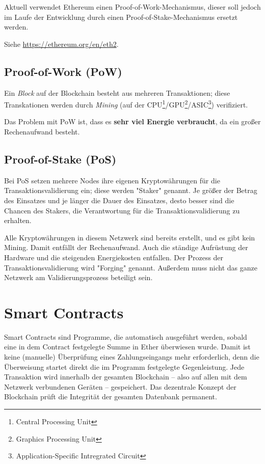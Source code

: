 Aktuell verwendet Ethereum einen Proof-of-Work-Mechanismus, dieser soll jedoch im Laufe der Entwicklung durch einen Proof-of-Stake-Mechanismus ersetzt werden.

Siehe \url{https://ethereum.org/en/eth2}.

\subsection{Proof-of-Work (PoW)} \label{l_mining}
Ein \textit{Block} auf der Blockchain besteht aus mehreren Transaktionen; diese Transkationen werden durch \textit{Mining} (auf der CPU\footnote{Central Processing Unit}/GPU\footnote{Graphics Processing Unit}/ASIC\footnote{Application-Specific Intregrated Circuit}) verifiziert.

Das Problem mit PoW ist, dass es \textbf{sehr viel Energie verbraucht}, da ein großer Rechenaufwand besteht.

\subsection{Proof-of-Stake (PoS)}
Bei PoS setzen mehrere Nodes ihre eigenen Kryptowährungen für die Transaktionsvalidierung ein; diese werden "Staker" genannt. Je größer der Betrag des Einsatzes und je länger die Dauer des Einsatzes, desto besser sind die Chancen des Stakers, die Verantwortung für die Transaktionsvalidierung zu erhalten.

Alle Kryptowährungen in diesem Netzwerk sind bereits erstellt, und es gibt kein Mining. Damit entfällt der Rechenaufwand. Auch die ständige Aufrüstung der Hardware und die steigenden Energiekosten entfallen. Der Prozess der Transaktionsvalidierung wird "Forging" genannt. Außerdem muss nicht das ganze Netzwerk am Validierungsprozess beteiligt sein.


\cite[vgl. Medium, PoW vs PoS]{PoW_vs_PoS}


\section{Smart Contracts}\label{l_smart_contracts}
Smart Contracts sind Programme, die automatisch ausgeführt werden, sobald eine in dem Contract festgelegte Summe in Ether überwiesen wurde. Damit ist keine (manuelle) Überprüfung eines Zahlungseingangs mehr erforderlich, denn die Überweisung startet direkt die im Programm festgelegte Gegenleistung.
Jede Transaktion wird innerhalb der gesamten Blockchain -- also auf allen mit dem Netzwerk verbundenen Geräten -- gespeichert. Das dezentrale Konzept der Blockchain prüft die Integrität der gesamten Datenbank permanent.

